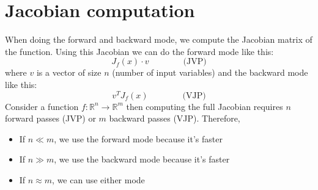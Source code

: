 \documentclass[12pt, openany]{report}
\newcommand{\R}{\mathbb{R}}
\theoremstyle{definition}
\begin{document}
\section{Jacobian computation}
When doing the forward and backward mode, we compute the Jacobian matrix of the function. 
Using this Jacobian we can do the forward mode like this:
\begin{equation}
  J_f(x) \cdot v \qquad \qquad \text{(JVP)}
\end{equation}
where $v$ is a vector of size $n$ (number of input variables)
and the backward mode like this:
\begin{equation}
  v^T J_f(x) \qquad \qquad \text{(VJP)}
\end{equation}
Consider a function $f:\R^n \rightarrow \R^m$ then computing the full Jacobian requires $n$ forward passes (JVP) or $m$ backward passes (VJP). Therefore,
\begin{itemize}
  \item If $n \ll m$, we use the forward mode because it's faster
  \item If $n \gg m$, we use the backward mode because it's faster
  \item If $n \approx m$, we can use either mode
\end{itemize}
\end{document}
